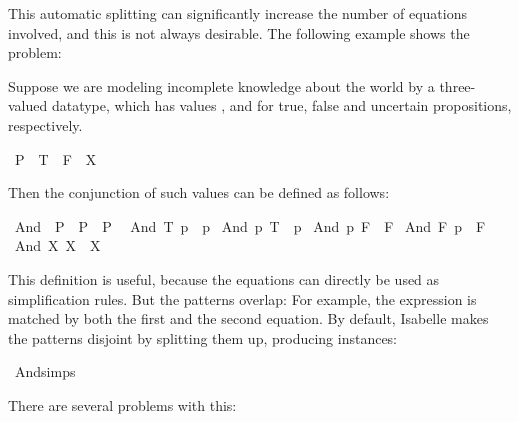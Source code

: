 \begin{isabellebody}
\begin{isamarkuptext}
  This automatic splitting can significantly increase the number of
  equations involved, and this is not always desirable. The following
  example shows the problem:
  
  Suppose we are modeling incomplete knowledge about the world by a
  three-valued datatype, which has values , 
  and  for true, false and uncertain propositions, respectively.%
\end{isamarkuptext}%
\isamarkuptrue%
\isamarkupfalse%
\ P{}\ {\isacharequal}\ T\ {\isacharbar}\ F\ {\isacharbar}\ X%
\begin{isamarkuptext}%
\noindent Then the conjunction of such values can be defined as follows:%
\end{isamarkuptext}%
\isamarkuptrue%
\isamarkupfalse%
\ And\ {\isacharcolon}{\isacharcolon}\ {\isachardoublequoteopen}P{}\ {\isasymRightarrow}\ P{}\ {\isasymRightarrow}\ P{}{\isachardoublequoteclose}\isanewline
{}\isanewline
\ \ {\isachardoublequoteopen}And\ T\ p\ {\isacharequal}\ p{\isachardoublequoteclose}\isanewline
{\isacharbar}\ {\isachardoublequoteopen}And\ p\ T\ {\isacharequal}\ p{\isachardoublequoteclose}\isanewline
{\isacharbar}\ {\isachardoublequoteopen}And\ p\ F\ {\isacharequal}\ F{\isachardoublequoteclose}\isanewline
{\isacharbar}\ {\isachardoublequoteopen}And\ F\ p\ {\isacharequal}\ F{\isachardoublequoteclose}\isanewline
{\isacharbar}\ {\isachardoublequoteopen}And\ X\ X\ {\isacharequal}\ X{\isachardoublequoteclose}%
\begin{isamarkuptext}%
This definition is useful, because the equations can directly be used
  as simplification rules. But the patterns overlap: For example,
  the expression  is matched by both the first and
  the second equation. By default, Isabelle makes the patterns disjoint by
  splitting them up, producing instances:%
\end{isamarkuptext}%
\isamarkuptrue%
\isamarkupfalse%
\ And{\isachardot}simps%
\begin{isamarkuptext}%
  
  \vspace*{1em}
  \noindent There are several problems with this:


\end{isamarkuptext}
\end{isabellebody}
